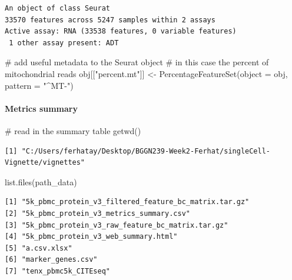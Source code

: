 \documentclass[
  letterpaper,
  DIV=11,
  numbers=noendperiod]{scrartcl}
\let\oldparagraph\paragraph
\renewcommand{\paragraph}[1]{\oldparagraph{#1}\mbox{}}
\newenvironment{Shaded}{\begin{snugshade}}{\end{snugshade}}
\newcommand{\AttributeTok}[1]{\textcolor[rgb]{0.40,0.45,0.13}{#1}}
\newcommand{\CommentTok}[1]{\textcolor[rgb]{0.37,0.37,0.37}{#1}}
\newcommand{\FunctionTok}[1]{\textcolor[rgb]{0.28,0.35,0.67}{#1}}
\newcommand{\NormalTok}[1]{\textcolor[rgb]{0.00,0.23,0.31}{#1}}
\newcommand{\OtherTok}[1]{\textcolor[rgb]{0.00,0.23,0.31}{#1}}
\newcommand{\StringTok}[1]{\textcolor[rgb]{0.13,0.47,0.30}{#1}}
\begin{document}
\begin{verbatim}
An object of class Seurat 
33570 features across 5247 samples within 2 assays 
Active assay: RNA (33538 features, 0 variable features)
 1 other assay present: ADT
\end{verbatim}

\begin{Shaded}
\begin{Highlighting}[]
\CommentTok{\# add useful metadata to the Seurat object}
\CommentTok{\# in this case the percent of mitochondrial reads}
\NormalTok{obj[[}\StringTok{"percent.mt"}\NormalTok{]] }\OtherTok{\textless{}{-}} \FunctionTok{PercentageFeatureSet}\NormalTok{(}\AttributeTok{object =}\NormalTok{ obj, }\AttributeTok{pattern =} \StringTok{"\^{}MT{-}"}\NormalTok{)}
\end{Highlighting}
\end{Shaded}

\hypertarget{metrics-summary}{%
\paragraph{Metrics summary}\label{metrics-summary}}

\begin{Shaded}
\begin{Highlighting}[]
\CommentTok{\# read in the summary table}
\FunctionTok{getwd}\NormalTok{()}
\end{Highlighting}
\end{Shaded}

\begin{verbatim}
[1] "C:/Users/ferhatay/Desktop/BGGN239-Week2-Ferhat/singleCell-Vignette/vignettes"
\end{verbatim}

\begin{Shaded}
\begin{Highlighting}[]
\FunctionTok{list.files}\NormalTok{(path\_data)}
\end{Highlighting}
\end{Shaded}

\begin{verbatim}
[1] "5k_pbmc_protein_v3_filtered_feature_bc_matrix.tar.gz"
[2] "5k_pbmc_protein_v3_metrics_summary.csv"              
[3] "5k_pbmc_protein_v3_raw_feature_bc_matrix.tar.gz"     
[4] "5k_pbmc_protein_v3_web_summary.html"                 
[5] "a.csv.xlsx"                                          
[6] "marker_genes.csv"                                    
[7] "tenx_pbmc5k_CITEseq"                                 
\end{verbatim}
\end{document}
